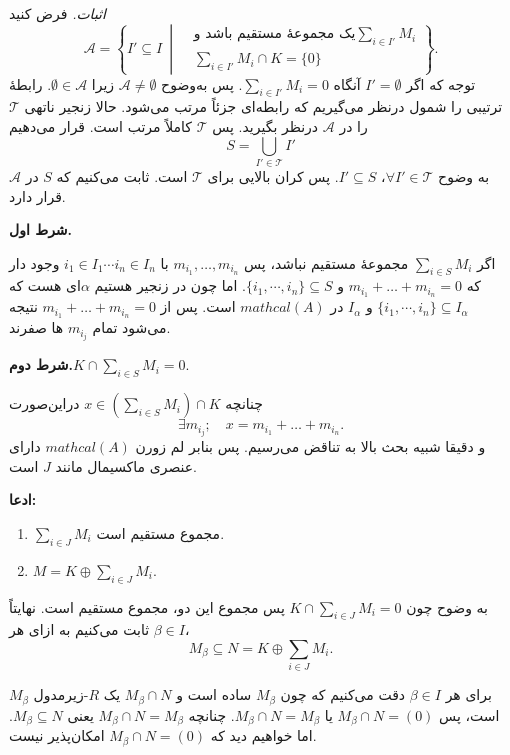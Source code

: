 \textit{اثبات.} فرض کنید
\[
    \mathcal{A} = \left\{ I' \subseteq I \ \middle|
    \begin{aligned}
         & \text{یک مجموعهٔ مستقیم باشد و} \sum_{i \in I'} M_i \\
         & \sum_{i \in I'} M_i \cap K = \{0\}
    \end{aligned} \right\}.
\]
توجه که اگر
$I' = \emptyset$
آنگاه
$\sum_{i \in I'} M_i = 0$.
پس به‌وضوح
$\mathcal{A} \neq \emptyset$
زیرا
$\emptyset \in \mathcal{A}$.
رابطهٔ ترتیبی را شمول درنظر می‌گیریم که رابطه‌ای جزئاً مرتب می‌شود. حالا زنجیر ناتهی
$\mathcal{T}$
را در
$\mathcal{A}$
درنظر بگیرید. پس
$\mathcal{T}$
کاملاً مرتب است.
قرار می‌دهیم
\[
    S = \bigcup_{I' \in \mathcal{T}} I'
\]
به وضوح
$\forall I' \in \mathcal{T}$، $I' \subseteq S$.
پس کران  بالایی برای
\(\mathcal{T}\)
است. ثابت می‌کنیم که
\(S\)
در
\(\mathcal{A}\)
قرار دارد.




\textbf{شرط اول.}



اگر
$\sum_{i \in S} M_i$
مجموعهٔ مستقیم نباشد، پس
$ m_{i_1}, \dots, m_{i_n}$
با
\(i_1 \in I_1 \cdots i_n \in I_n\)
وجود دار که
$m_{i_1} + \dots + m_{i_n} = 0$
و
\(\{i_1, \cdots, i_n\} \subseteq S\).
اما چون در زنجیر هستیم
\(\alpha\)ای
هست که
\(\{i_1, \cdots, i_n\} \subseteq I_\alpha\)
و
\(I_\alpha\)
در
\(mathcal(A)\)
است. پس از
$m_{i_1} + \dots + m_{i_n} = 0$
نتیجه می‌شود تمام
\(m_{i_j}\)
ها صفرند.

\textbf{شرط دوم.}\( K \cap \sum_{i \in S} M_i = 0.\)

چنانچه
$x \in \left(\sum_{i \in S} M_i\right) \cap K$
دراین‌صورت
\[
    \exists m_{i_j}; \quad x = m_{i_1} + \dots + m_{i_n}.
\]
و دقیقا شبیه بحث بالا به تناقض می‌رسیم. پس بنابر لم زورن
\(mathcal(A)\)
دارای عنصری ماکسیمال مانند
\(J\)
است.

\textbf{ادعا:}
\begin{enumerate}[label = \Roman*.]
    \item $\sum_{i \in J} M_i$ مجموع مستقیم است.
    \item$M = K \oplus \sum_{i \in J} M_i$.
\end{enumerate}
به وضوح چون $K \cap \sum_{i \in J} M_i = 0$ پس مجموع این دو، مجموع مستقیم است.
نهایتاً ثابت می‌کنیم به ازای هر
\(\beta \in I\)،
\[
    M_\beta \subseteq N = K \oplus \sum_{i \in J} M_i.
\]



برای هر $\beta \in I$ دقت می‌کنیم که چون $M_\beta$ ساده است و $M_\beta \cap N$ یک $R$-زیرمدول $M_\beta$ است، پس $M_\beta \cap N =(0)$ یا $M_\beta \cap N =  M_\beta$.
چنانچه
$M_\beta \cap N =  M_\beta$
یعنی
\(M_\beta \subseteq N\).
اما خواهیم دید که
$M_\beta \cap N =(0)$
امکان‌پذیر نیست.

